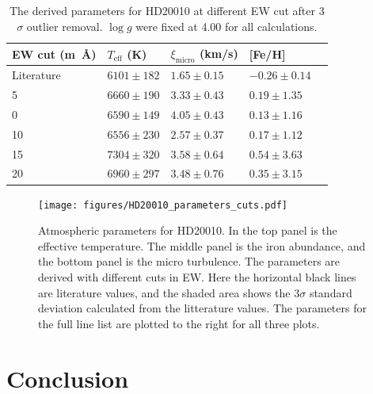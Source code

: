 \documentclass{aa}
\begin{document}
\begin{table}[htb!]
    \caption{The derived parameters for HD20010 at different EW cut after 3$\sigma$ outlier removal.
    $\log g$ were fixed at 4.00 for all calculations.}
    \label{tab:hd20010}
    \centering
    \begin{tabular}{lllll}
      \hline\hline
        EW cut (\si{m\angstrom}) & $T_\mathrm{eff}$ (K) & $\xi_\mathrm{micro}$ (km/s)  & [Fe/H]           \\
      \hline
        Literature               & $6101 \pm 182$       & $1.65 \pm0.15$              & $-0.26 \pm 0.14$ \\
      \hline
               5                 & $6660 \pm 190$       & $3.33 \pm 0.43$              & $0.19 \pm 1.35$  \\
               0                 & $6590 \pm 149$       & $4.05 \pm 0.43$              & $0.13 \pm 1.16$  \\
              10                 & $6556 \pm 230$       & $2.57 \pm 0.37$              & $0.17 \pm 1.12$  \\
              15                 & $7304 \pm 320$       & $3.58 \pm 0.64$              & $0.54 \pm 3.63$  \\
              20                 & $6960 \pm 297$       & $3.48 \pm 0.76$              & $0.35 \pm 3.15$  \\
      \hline
    \end{tabular}
\end{table}



\begin{figure}[tpb!]
    \centering
    \texttt{[image: figures/HD20010\_parameters\_cuts.pdf]}
    \caption{Atmospheric parameters for HD20010. In the top panel is
    the effective temperature. The middle panel is the iron abundance,
    and the bottom panel is the micro turbulence. The parameters are
    derived with different cuts in EW. Here the horizontal black lines
    are literature values, and the shaded area shows the $3 \sigma$ standard
    deviation calculated from the litterature values. The parameters for
    the full line list are plotted to the right for all three plots.}
    \label{fig:HD20010_parameters_cuts}
\end{figure}




\section{Conclusion}
\label{sec:conclusion}
\end{document}
